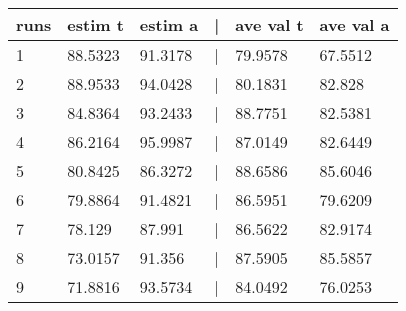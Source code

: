 \begin{tabular}{llllll}
runs & estim t & estim a & | & ave val t & ave val a \\ 
\hline 
1 & 88.5323 & 91.3178 & | & 79.9578 & 67.5512 \\ 
2 & 88.9533 & 94.0428 & | & 80.1831 & 82.828 \\ 
3 & 84.8364 & 93.2433 & | & 88.7751 & 82.5381 \\ 
4 & 86.2164 & 95.9987 & | & 87.0149 & 82.6449 \\ 
5 & 80.8425 & 86.3272 & | & 88.6586 & 85.6046 \\ 
6 & 79.8864 & 91.4821 & | & 86.5951 & 79.6209 \\ 
7 & 78.129 & 87.991 & | & 86.5622 & 82.9174 \\ 
8 & 73.0157 & 91.356 & | & 87.5905 & 85.5857 \\ 
9 & 71.8816 & 93.5734 & | & 84.0492 & 76.0253 \\ 
\hline 
\end{tabular}